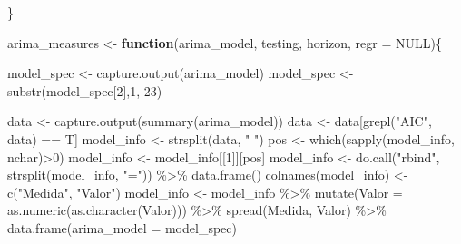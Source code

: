 \documentclass[
]{article}
\newenvironment{Shaded}{\begin{snugshade}}{\end{snugshade}}
\newcommand{\AttributeTok}[1]{\textcolor[rgb]{0.77,0.63,0.00}{#1}}
\newcommand{\ConstantTok}[1]{\textcolor[rgb]{0.00,0.00,0.00}{#1}}
\newcommand{\ControlFlowTok}[1]{\textcolor[rgb]{0.13,0.29,0.53}{\textbf{#1}}}
\newcommand{\DecValTok}[1]{\textcolor[rgb]{0.00,0.00,0.81}{#1}}
\newcommand{\FunctionTok}[1]{\textcolor[rgb]{0.00,0.00,0.00}{#1}}
\newcommand{\NormalTok}[1]{#1}
\newcommand{\OtherTok}[1]{\textcolor[rgb]{0.56,0.35,0.01}{#1}}
\newcommand{\SpecialCharTok}[1]{\textcolor[rgb]{0.00,0.00,0.00}{#1}}
\newcommand{\StringTok}[1]{\textcolor[rgb]{0.31,0.60,0.02}{#1}}
\begin{document}
\begin{Shaded}
\begin{Highlighting}[]
\NormalTok{    \}}

\NormalTok{    arima\_measures }\OtherTok{\textless{}{-}} \ControlFlowTok{function}\NormalTok{(arima\_model, testing, horizon, }\AttributeTok{regr =} \ConstantTok{NULL}\NormalTok{)\{}

\NormalTok{        model\_spec }\OtherTok{\textless{}{-}} \FunctionTok{capture.output}\NormalTok{(arima\_model)}
\NormalTok{        model\_spec }\OtherTok{\textless{}{-}} \FunctionTok{substr}\NormalTok{(model\_spec[}\DecValTok{2}\NormalTok{],}\DecValTok{1}\NormalTok{, }\DecValTok{23}\NormalTok{)}

     
\NormalTok{        data }\OtherTok{\textless{}{-}} \FunctionTok{capture.output}\NormalTok{(}\FunctionTok{summary}\NormalTok{(arima\_model))}
\NormalTok{        data }\OtherTok{\textless{}{-}}\NormalTok{ data[}\FunctionTok{grepl}\NormalTok{(}\StringTok{"AIC"}\NormalTok{, data) }\SpecialCharTok{==}\NormalTok{ T]}
\NormalTok{        model\_info }\OtherTok{\textless{}{-}} \FunctionTok{strsplit}\NormalTok{(data, }\StringTok{" "}\NormalTok{)}
\NormalTok{        pos }\OtherTok{\textless{}{-}} \FunctionTok{which}\NormalTok{(}\FunctionTok{sapply}\NormalTok{(model\_info, nchar)}\SpecialCharTok{\textgreater{}}\DecValTok{0}\NormalTok{)}
\NormalTok{        model\_info }\OtherTok{\textless{}{-}}\NormalTok{ model\_info[[}\DecValTok{1}\NormalTok{]][pos]}
\NormalTok{        model\_info }\OtherTok{\textless{}{-}} \FunctionTok{do.call}\NormalTok{(}\StringTok{"rbind"}\NormalTok{, }\FunctionTok{strsplit}\NormalTok{(model\_info, }\StringTok{"="}\NormalTok{)) }\SpecialCharTok{\%\textgreater{}\%}
            \FunctionTok{data.frame}\NormalTok{()}
        \FunctionTok{colnames}\NormalTok{(model\_info) }\OtherTok{\textless{}{-}} \FunctionTok{c}\NormalTok{(}\StringTok{"Medida"}\NormalTok{, }\StringTok{"Valor"}\NormalTok{)}
\NormalTok{        model\_info }\OtherTok{\textless{}{-}}\NormalTok{ model\_info }\SpecialCharTok{\%\textgreater{}\%}
            \FunctionTok{mutate}\NormalTok{(}\AttributeTok{Valor =} \FunctionTok{as.numeric}\NormalTok{(}\FunctionTok{as.character}\NormalTok{(Valor))) }\SpecialCharTok{\%\textgreater{}\%}
            \FunctionTok{spread}\NormalTok{(Medida, Valor) }\SpecialCharTok{\%\textgreater{}\%}
            \FunctionTok{data.frame}\NormalTok{(}\AttributeTok{arima\_model =}\NormalTok{ model\_spec)}


\end{Highlighting}
\end{Shaded}
\end{document}

